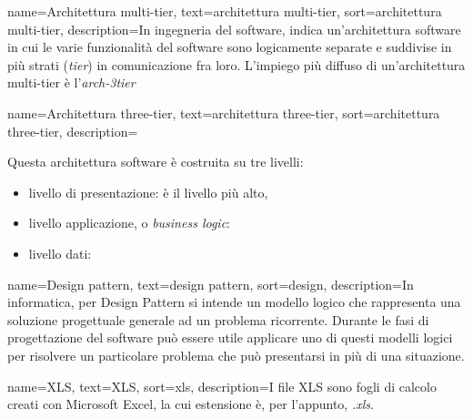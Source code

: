 {
    name=Architettura multi-tier,
    text=architettura multi-tier,
    sort=architettura multi-tier,
    description={In ingegneria del software, indica un'architettura software in cui le varie funzionalità del software sono logicamente separate e suddivise in più strati (\textit{tier}) in comunicazione fra loro. L'impiego più diffuso di un'architettura multi-tier è l'\emph{\gls{arch-3tier}}\glsfirstoccur   
}}

{
    name=Architettura three-tier,
    text=architettura three-tier,
    sort=architettura three-tier,
    description={Questa architettura software è costruita su tre livelli:
        \begin{itemize}
            \item livello di presentazione: è il livello più alto, 
            \item livello applicazione, o \textit{business logic}:
            \item livello dati:
        \end{itemize}
}}

{
    name=Design pattern,
    text=design pattern,
    sort=design,
    description={In informatica, per Design Pattern si intende un modello logico che rappresenta una soluzione progettuale generale ad un problema ricorrente. Durante le fasi di progettazione del software può essere utile applicare uno di questi modelli logici per risolvere un particolare problema che può presentarsi in più di una situazione.
}}

{
    name=XLS,
    text=XLS,
    sort=xls,
    description={I file XLS sono fogli di calcolo creati con Microsoft Excel, la cui estensione è, per l'appunto, \textit{.xls}.
}}

